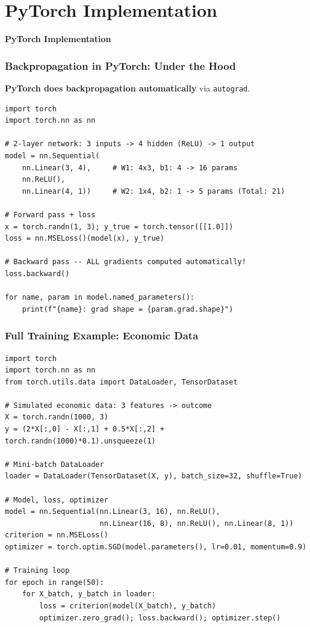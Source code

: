 \documentclass[notes,11pt, aspectratio=169]{beamer}
\newenvironment{transitionframe}{
  \setbeamercolor{background canvas}{bg=yellow}
  \begin{frame}}{
    \end{frame}
}
\begin{document}
\section{PyTorch Implementation}

\begin{transitionframe}
\begin{center}
{\Huge \textbf{PyTorch Implementation}}
\end{center}
\end{transitionframe}

\begin{frame}[fragile]
\frametitle{Backpropagation in PyTorch: Under the Hood}

\textbf{PyTorch does backpropagation automatically} via \texttt{autograd}.

\begin{lstlisting}
import torch
import torch.nn as nn

# 2-layer network: 3 inputs -> 4 hidden (ReLU) -> 1 output
model = nn.Sequential(
    nn.Linear(3, 4),     # W1: 4x3, b1: 4 -> 16 params
    nn.ReLU(),
    nn.Linear(4, 1))     # W2: 1x4, b2: 1 -> 5 params (Total: 21)

# Forward pass + loss
x = torch.randn(1, 3); y_true = torch.tensor([[1.0]])
loss = nn.MSELoss()(model(x), y_true)

# Backward pass -- ALL gradients computed automatically!
loss.backward()

for name, param in model.named_parameters():
    print(f"{name}: grad shape = {param.grad.shape}")
\end{lstlisting}
\end{frame}

\begin{frame}[fragile]
\frametitle{Full Training Example: Economic Data}

\begin{lstlisting}
import torch
import torch.nn as nn
from torch.utils.data import DataLoader, TensorDataset

# Simulated economic data: 3 features -> outcome
X = torch.randn(1000, 3)
y = (2*X[:,0] - X[:,1] + 0.5*X[:,2] + torch.randn(1000)*0.1).unsqueeze(1)

# Mini-batch DataLoader
loader = DataLoader(TensorDataset(X, y), batch_size=32, shuffle=True)

# Model, loss, optimizer
model = nn.Sequential(nn.Linear(3, 16), nn.ReLU(),
                      nn.Linear(16, 8), nn.ReLU(), nn.Linear(8, 1))
criterion = nn.MSELoss()
optimizer = torch.optim.SGD(model.parameters(), lr=0.01, momentum=0.9)

# Training loop
for epoch in range(50):
    for X_batch, y_batch in loader:
        loss = criterion(model(X_batch), y_batch)
        optimizer.zero_grad(); loss.backward(); optimizer.step()
\end{lstlisting}
\end{frame}
\end{document}
